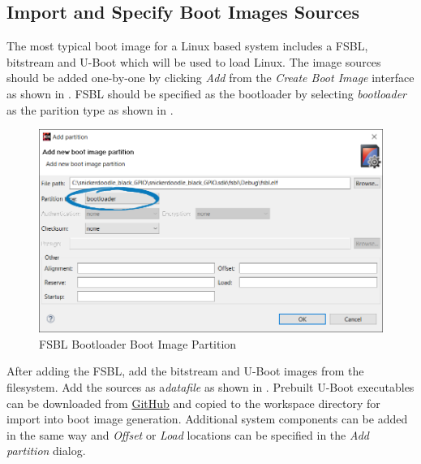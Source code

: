\subsection{Import and Specify Boot Images Sources}

The most typical boot image for a Linux based system includes a FSBL, bitstream and U-Boot which will be used to load Linux. The image sources should be added one-by-one by clicking \textit{Add} from the \textit{Create Boot Image} interface as shown in . FSBL should be specified as the bootloader by selecting \textit{bootloader} as the parition type as shown in . \\


\begin{figure}
	\centering
	\includegraphics{images/sdk/fsbl_boot_partition.png}
	\caption{FSBL Bootloader Boot Image Partition}
	\label{fig:fsblbootimagepart}
\end{figure}


After adding the FSBL, add the bitstream and U-Boot images from the filesystem. Add the sources as a\textit{datafile} as shown in . Prebuilt U-Boot executables can be downloaded from \href{https://github.com/krtkl}{GitHub} and copied to the workspace directory for import into boot image generation. Additional system components can be added in the same way and \textit{Offset} or \textit{Load} locations can be specified in the \textit{Add partition} dialog. \\


